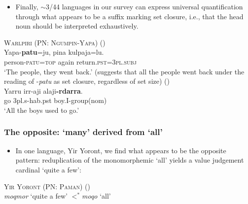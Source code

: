 \documentclass{article}
\begin{document}
\begin{itemize}
\item Finally, $\sim$3/44 languages in our survey can express universal quantification through what appears to be a suffix marking set closure, i.e., that the head noun should be interpreted exhaustively. 
\end{itemize}

\begin{exe}
  \ex \textsc{Warlpiri (PN: Ngumpin-Yapa)} (\citealt[13--14]{bowler17})\\
  \gll Yapa-\textbf{patu}=ju, pina kulpaja=lu.\\
  person-\textsc{patu}=\textsc{top} again return.\textsc{pst}=\textsc{3pl.subj}\\
  \glt `The people, they went back.' (suggests that all the people went back under the reading of -\textit{patu} as set closure, regardless of set size)
   (\citealt[80]{nordlinger98})\\
  \gll Yarru irr-aji  alaji\textbf{-rdarra}.\\
  go  3{\sc pl.s-hab.pst} boy.I-{\sc group(nom)}\\
  \glt `All the boys used to go.' 
\end{exe}


\subsubsection{The opposite: `many' derived from `all'}
\label{sec:rdpall}
\begin{itemize}
\item In one language, Yir Yoront, we find what appears to be the opposite pattern: reduplication of the monomorphemic `all' yields a value judgement cardinal `quite a few':
\end{itemize}
\begin{exe}
  \ex \textsc{Yir Yoront (PN: Paman)} (\citealt[375]{alpher73})\\
  \textit{\charis moqmor} `quite a few' $<^*$\textit{\charis moqo} `all'
\end{exe}
\end{document}
